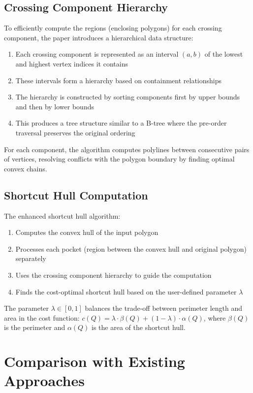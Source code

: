 \documentclass[10pt,letterpaper]{article}
\begin{document}
\subsection{Crossing Component Hierarchy}
To efficiently compute the regions (enclosing polygons) for each crossing component, the paper introduces a hierarchical data structure:

\begin{enumerate}
    \item Each crossing component is represented as an interval $(a,b)$ of the lowest and highest vertex indices it contains
    \item These intervals form a hierarchy based on containment relationships
    \item The hierarchy is constructed by sorting components first by upper bounds and then by lower bounds
    \item This produces a tree structure similar to a B-tree where the pre-order traversal preserves the original ordering
\end{enumerate}

For each component, the algorithm computes polylines between consecutive pairs of vertices, resolving conflicts with the polygon boundary by finding optimal convex chains.

\subsection{Shortcut Hull Computation}
The enhanced shortcut hull algorithm:
\begin{enumerate}
    \item Computes the convex hull of the input polygon
    \item Processes each pocket (region between the convex hull and original polygon) separately
    \item Uses the crossing component hierarchy to guide the computation
    \item Finds the cost-optimal shortcut hull based on the user-defined parameter $\lambda$
\end{enumerate}

The parameter $\lambda \in [0,1]$ balances the trade-off between perimeter length and area in the cost function: $c(Q) = \lambda \cdot \beta(Q) + (1-\lambda) \cdot \alpha(Q)$, where $\beta(Q)$ is the perimeter and $\alpha(Q)$ is the area of the shortcut hull.

\section{Comparison with Existing Approaches}
\end{document}
